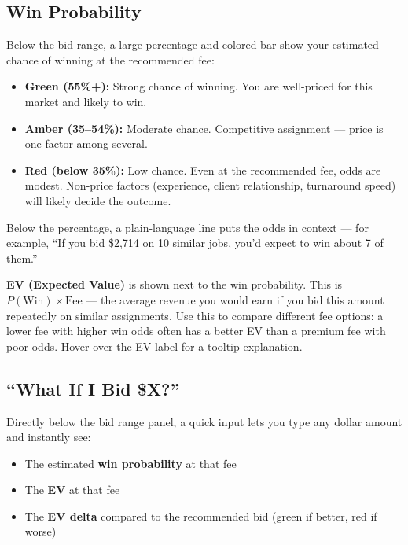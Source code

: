 \documentclass[12pt,a4paper]{article}
\newcommand{\term}[1]{\textbf{#1}}
\begin{document}
\subsection{Win Probability}

Below the bid range, a large percentage and colored bar show your estimated chance of
winning at the recommended fee:

\begin{itemize}[leftmargin=2em]
    \item \textcolor{gssgreen}{\textbf{Green (55\%+):}} Strong chance of winning. You are
          well-priced for this market and likely to win.
    \item \textcolor{gssamber}{\textbf{Amber (35--54\%):}} Moderate chance. Competitive
          assignment --- price is one factor among several.
    \item \textcolor{gssred}{\textbf{Red (below 35\%):}} Low chance. Even at the
          recommended fee, odds are modest. Non-price factors (experience, client
          relationship, turnaround speed) will likely decide the outcome.
\end{itemize}

Below the percentage, a plain-language line puts the odds in context --- for example,
``If you bid \$2,714 on 10 similar jobs, you'd expect to win about 7 of them.''

\term{EV (Expected Value)} is shown next to the win probability. This is
$P(\text{Win}) \times \text{Fee}$ --- the average revenue you would earn if you bid
this amount repeatedly on similar assignments. Use this to compare different fee
options: a lower fee with higher win odds often has a better EV than a premium fee
with poor odds. Hover over the EV label for a tooltip explanation.

\subsection{``What If I Bid \$X?''}

Directly below the bid range panel, a quick input lets you type any dollar amount and
instantly see:

\begin{itemize}[leftmargin=2em]
    \item The estimated \textbf{win probability} at that fee
    \item The \textbf{EV} at that fee
    \item The \textbf{EV delta} compared to the recommended bid (green if better, red if worse)
\end{itemize}
\end{document}
